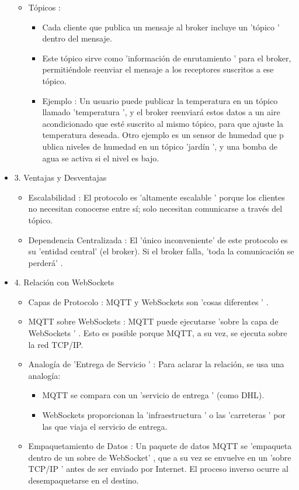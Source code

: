 \documentclass{report}
\begin{document}
\begin{itemize}
\begin{itemize}
        \item Tópicos :
        \begin{itemize}
            \item Cada cliente que publica un mensaje al broker incluye un   'tópico '  dentro del mensaje.
            \item Este tópico sirve como   'información de enrutamiento '  para el broker, permitiéndole reenviar el mensaje a los receptores 
            suscritos a ese tópico.
            \item Ejemplo : Un usuario puede publicar la temperatura en un tópico llamado  'temperatura ', y el broker reenviará estos datos a un 
            aire acondicionado que esté suscrito al mismo tópico, para que ajuste la temperatura deseada. Otro ejemplo es un sensor de humedad que p
            ublica niveles de humedad en un tópico  'jardín ', y una bomba de agua se activa si el nivel es bajo.
        \end{itemize}
    \end{itemize}

    \item 3. Ventajas y Desventajas
    \begin{itemize}
        \item Escalabilidad : El protocolo es 'altamente escalable '  porque los clientes no necesitan conocerse entre sí; solo necesitan comunicarse 
        a través del tópico.
        \item Dependencia Centralizada : El 'único inconveniente'  de este protocolo es su   'entidad central'  (el broker). Si el broker falla, 
        'toda la comunicación se perderá' .
    \end{itemize}

    \item 4. Relación con WebSockets
    \begin{itemize}
        \item Capas de Protocolo : MQTT y WebSockets son  'cosas diferentes ' .
        \item MQTT sobre WebSockets : MQTT puede ejecutarse   'sobre la capa de WebSockets ' . Esto es posible porque MQTT, a su vez, se ejecuta sobre 
        la red TCP/IP.
        \item Analogía de  'Entrega de Servicio ' : Para aclarar la relación, se usa una analogía:
        \begin{itemize}
            \item MQTT se compara con un   'servicio de entrega '  (como DHL).
            \item WebSockets proporcionan la   'infraestructura '  o las  'carreteras ' por las que viaja el servicio de entrega.
        \end{itemize}
        \item Empaquetamiento de Datos : Un paquete de datos MQTT se   'empaqueta dentro de un sobre de WebSocket' , que a su vez se envuelve en un  
        'sobre TCP/IP ' antes de ser enviado por Internet. El proceso inverso ocurre al desempaquetarse en el destino.
    \end{itemize}


\end{itemize}
\end{document}
